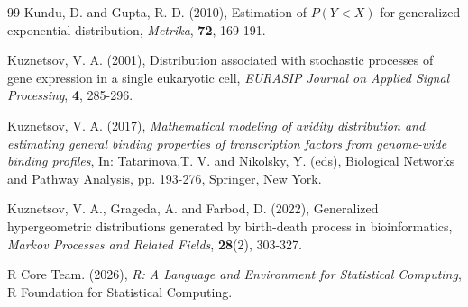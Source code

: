 \documentclass[twoside]{article}
\begin{document}
\begin{thebibliography}{99}
Kundu, D. and Gupta, R. D. (2010), Estimation of $P(Y<X)$ for generalized exponential distribution, \textit{Metrika}, \textbf{72}, 169-191.

Kuznetsov, V. A. (2001), Distribution associated with stochastic processes of gene expression in a single eukaryotic cell,  \textit{EURASIP Journal on Applied Signal Processing},   \textbf{4}, 285-296.

Kuznetsov, V. A. (2017), {\it Mathematical modeling of avidity distribution and estimating general binding properties of transcription factors from genome-wide binding profiles}, In: Tatarinova,T. V. and Nikolsky, Y. (eds), Biological Networks and Pathway Analysis, pp. 193-276, Springer, New York.

Kuznetsov, V. A., Grageda, A. and  Farbod, D. (2022), Generalized hypergeometric distributions generated by birth-death process in bioinformatics, {\it Markov Processes and Related Fields}, \textbf{28}(2), 303-327.

R Core Team.   (2026),  \textit{R: A Language and Environment for Statistical Computing},  R Foundation for Statistical Computing.

\end{thebibliography}

 
\end{document}

